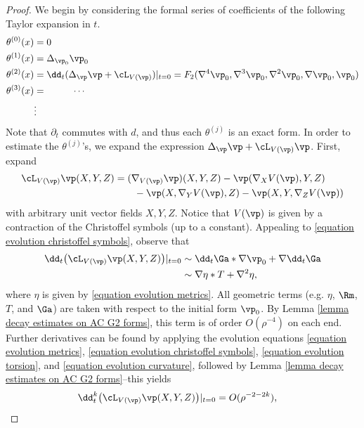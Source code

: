 \documentclass[hidelinks, 12pt, oneside, reqno]{amsart}
\begin{document}
\begin{proof}
    We begin by considering the formal series of coefficients of the following Taylor expansion in $t$.
    \begin{align*}
        \theta^{(0)}(x) &= 0 \\
        \theta^{(1)}(x) &= \Delta_{\vp_0} \vp_0 \\
        \theta^{(2)}(x) &= \dd_t (\Delta_{\vp} \vp + \cL_{V(\vp)})|_{t=0} = F_2(\nabla^4 \vp_0, \nabla^3 \vp_0, \nabla^2 \vp_0, \nabla \vp_0, \vp_0) \\
        \theta^{(3)}(x) &= \hspace{1cm} \cdots \\
        &\vdots
    \end{align*}
    Note that $\partial_t$ commutes with $d$, and thus each $\theta^{(j)}$ is an exact form. In order to estimate the $\theta^{(j)}$'s, we expand the expression $\Delta_\vp \vp + \cL_{V(\vp)}\vp$. First, expand 
    \begin{align*}
        \cL_{V(\vp)} \vp (X,Y,Z) &= (\nabla_{V(\vp)}\vp)(X,Y,Z) - \vp(\nabla_X V(\vp), Y, Z) \\
        &\qquad - \vp(X, \nabla_Y V(\vp), Z) - \vp(X, Y, \nabla_Z V(\vp))
    \end{align*}
    with arbitrary unit vector fields $X,Y,Z$. Notice that $V(\vp)$ is given by a contraction of the Christoffel symbols (up to a constant). Appealing to \eqref{equation evolution christoffel symbols}, observe that
    \begin{align*}
        \dd_t \big(\cL_{V(\vp)} \vp (X,Y,Z)\big)|_{t=0} &\sim \dd_t \Ga * \nabla \vp_0 +  \nabla \dd_t \Ga \\
        &\sim \nabla \eta * T + \nabla^2 \eta,
    \end{align*}
    where $\eta$ is given by \eqref{equation evolution metrics}. All geometric terms (e.g. $\eta$, $\Rm$, $T$, and $\Ga$) are taken with respect to the initial form $\vp_0$. By Lemma \ref{lemma decay estimates on AC G2 forms}, this term is of order $O(\rho^{-4})$ on each end. Further derivatives can be found by applying the evolution equations \eqref{equation evolution metrics}, \eqref{equation evolution christoffel symbols}, \eqref{equation evolution torsion}, and \eqref{equation evolution curvature}, followed by Lemma \ref{lemma decay estimates on AC G2 forms}--this yields
    \begin{align*}
        \dd^k_t \big(\cL_{V(\vp)} \vp (X,Y,Z)\big)|_{t=0} &= O(\rho^{-2 - 2k}),
    \end{align*}

\end{proof}
\end{document}

